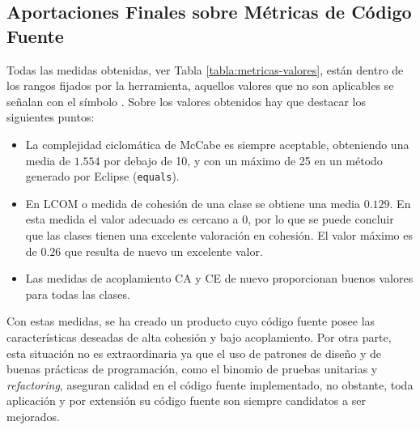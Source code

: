 \subsection{Aportaciones Finales sobre Métricas de Código Fuente}
Todas las medidas obtenidas, ver Tabla \ref{tabla:metricas-valores}, están dentro de
los rangos fijados por la herramienta, aquellos valores que no son aplicables 
se señalan con el símbolo \na. Sobre los valores obtenidos hay que destacar 
los siguientes puntos:

\begin{itemize}
  \item La complejidad ciclomática de McCabe es siempre aceptable, obteniendo
  una media de $1.554$ por debajo de 10, y con un máximo de 25 en un método generado 
por Eclipse (\texttt{equals}).

  \item En LCOM o medida de cohesión de una clase se obtiene una media $0.129$.
  En esta medida el valor adecuado es cercano a 0, por lo que se puede concluir que
  las clases tienen una excelente valoración en cohesión. El valor máximo
  es de $0.26$ que resulta de nuevo un excelente valor.

  \item Las medidas de acoplamiento CA y CE de nuevo proporcionan buenos valores para
  todas las clases. 

\end{itemize}

Con estas medidas, se ha creado un producto cuyo código fuente posee las
características deseadas de alta cohesión y bajo acoplamiento. Por otra parte,
esta situación no es extraordinaria ya que el uso de patrones de diseño y de buenas
prácticas de programación, como el binomio de pruebas unitarias y
\textit{refactoring}, aseguran calidad en el código fuente implementado, no obstante, 
toda aplicación y por extensión su código fuente son siempre candidatos a ser mejorados.




